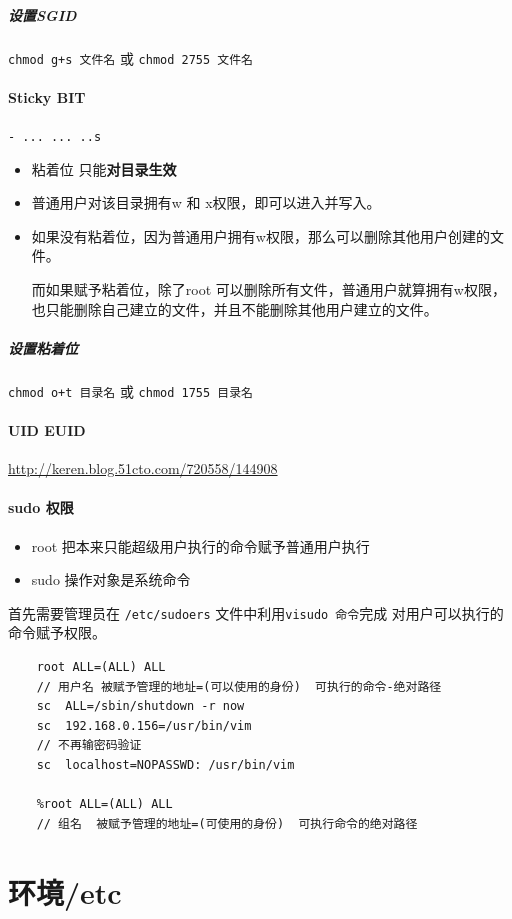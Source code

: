 \documentclass[UTF8,a4paper,12pt]{ctexbook}
\begin{document}
 			\subparagraph{设置SGID} \verb|chmod g+s 文件名| 或 \verb|chmod 2755 文件名|
		 \paragraph{Sticky BIT}\verb|- ... ... ..s|
		 	\begin{itemize}
		 		\item 粘着位 只能\textbf{对目录生效}
		 		\item 普通用户对该目录拥有w 和 x权限，即可以进入并写入。
		 		\item 如果没有粘着位，因为普通用户拥有w权限，那么可以删除其他用户创建的文件。
		 		
		 		而如果赋予粘着位，除了root 可以删除所有文件，普通用户就算拥有w权限，也只能删除自己建立的文件，并且不能删除其他用户建立的文件。
		 	\end{itemize}
		 
		 	\subparagraph{设置粘着位}\verb|chmod o+t 目录名| 或 \verb|chmod 1755 目录名|
		 	
		 \paragraph{UID EUID}
			 \url{http://keren.blog.51cto.com/720558/144908}
			 
		 \paragraph{sudo 权限}
		 	\begin{itemize}
		 		\item root 把本来只能超级用户执行的命令赋予普通用户执行
		 		\item sudo 操作对象是系统命令
		 	\end{itemize}
		 	
		 	首先需要管理员在 \verb|/etc/sudoers| 文件中利用\verb|visudo 命令|完成 对用户可以执行的命令赋予权限。
		 		\begin{lstlisting}
	root ALL=(ALL) ALL
	// 用户名 被赋予管理的地址=(可以使用的身份)  可执行的命令-绝对路径
	sc  ALL=/sbin/shutdown -r now
	sc  192.168.0.156=/usr/bin/vim
	// 不再输密码验证
	sc  localhost=NOPASSWD: /usr/bin/vim
	
	%root ALL=(ALL) ALL
	// 组名  被赋予管理的地址=(可使用的身份)  可执行命令的绝对路径
		 		\end{lstlisting}
		 	
		 	
		 	
		 

	\section{环境/etc}
\end{document}
